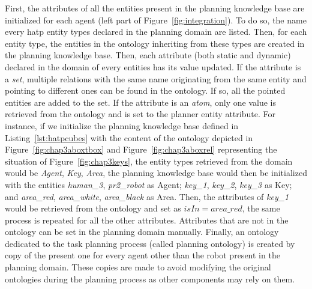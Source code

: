 \documentclass[a4paper,11pt,twoside]{StyleThese}
\begin{document}
First, the attributes of all the entities present in the planning knowledge base are initialized for each agent (left part of Figure~\ref{fig:integration}). To do so, the name every \acrshort{hatp} entity types declared in the planning domain are listed. Then, for each entity type, the entities in the ontology inheriting from these types are created in the planning knowledge base. Then, each attribute (both static and dynamic) declared in the domain of every entities has its value updated. If the attribute is a \textit{set}, multiple relations with the same name originating from the same entity and pointing to different ones can be found in the ontology. If so, all the pointed entities are added to the set. If the attribute is an \textit{atom}, only one value is retrieved from the ontology and is set to the planner entity attribute. For instance, if we initialize the planning knowledge base defined in Listing~\ref{lst:hatpcubes} with the content of the ontology depicted in Figure~\ref{fig:chap3aboxtbox} and Figure~\ref{fig:chap3aboxrel} representing the situation of Figure~\ref{fig:chap3keys}, the entity types retrieved from the domain would be \textit{Agent}, \textit{Key}, \textit{Area}, the planning knowledge base would then be initialized with the entities \textit{human\_3}, \textit{pr2\_robot} as Agent; \textit{key\_1}, \textit{key\_2}, \textit{key\_3} as Key; and \textit{area\_red}, \textit{area\_white}, \textit{area\_black} as Area. Then, the attributes of \textit{key\_1} would be retrieved from the ontology and set as $isIn = area\_red$, the same process is repeated for all the other attributes. Attributes that are not in the ontology can be set in the planning domain manually.
Finally, an ontology dedicated to the task planning process (called planning ontology) is created by copy of the present one for every agent other than the robot present in the planning domain. These copies are made to avoid modifying the original ontologies during the planning process as other components may rely on them.
\end{document}
